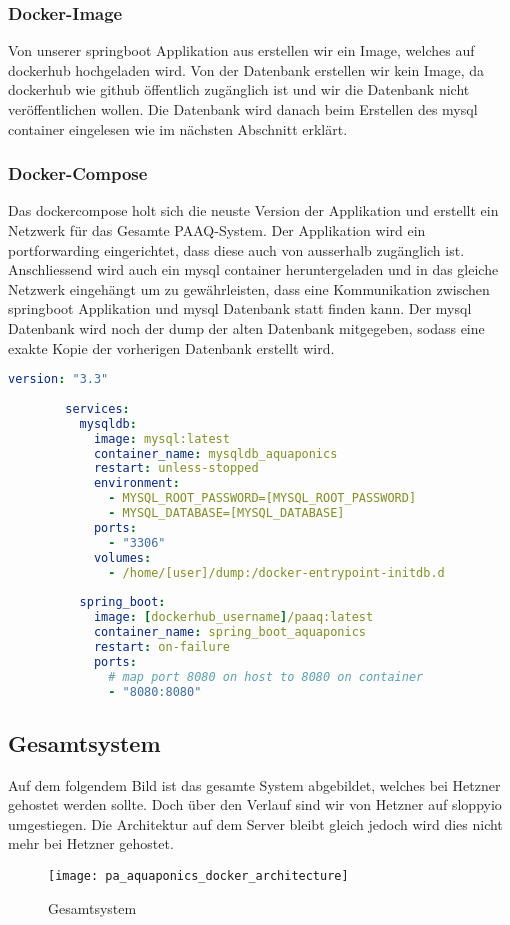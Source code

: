 \documentclass[../main.tex]{subfiles}
\begin{document}
	\subsubsection{Docker-Image}
	Von unserer \gls{springboot} Applikation aus erstellen wir ein Image, welches auf \gls{dockerhub} hochgeladen wird. Von der Datenbank erstellen wir kein Image, da \gls{dockerhub} wie \gls{github} öffentlich zugänglich ist und wir die Datenbank nicht veröffentlichen wollen. Die Datenbank wird danach beim Erstellen des \gls{mysql} \gls{container} eingelesen wie im nächsten Abschnitt erklärt.
	
	\subsubsection{Docker-Compose}
	Das \gls{dockercompose} holt sich die neuste Version der Applikation und erstellt ein Netzwerk für das Gesamte PAAQ-System. Der Applikation wird ein \gls{portforwarding} eingerichtet, dass diese auch von ausserhalb zugänglich ist. Anschliessend wird auch ein \gls{mysql} \gls{container} heruntergeladen und in das gleiche Netzwerk eingehängt um zu gewährleisten, dass eine Kommunikation zwischen \gls{springboot} Applikation und \gls{mysql} Datenbank statt finden kann. Der \gls{mysql} Datenbank wird noch der \gls{dump} der alten Datenbank mitgegeben, sodass eine exakte Kopie der vorherigen Datenbank erstellt wird.
	\begin{lstlisting}[language=yaml]
		version: "3.3"
		
		services:
		  mysqldb:
		    image: mysql:latest
		    container_name: mysqldb_aquaponics
		    restart: unless-stopped
		    environment:
		      - MYSQL_ROOT_PASSWORD=[MYSQL_ROOT_PASSWORD]
		      - MYSQL_DATABASE=[MYSQL_DATABASE]
		    ports:
		      - "3306"
		    volumes:
		      - /home/[user]/dump:/docker-entrypoint-initdb.d
		      
		  spring_boot:
		    image: [dockerhub_username]/paaq:latest
		    container_name: spring_boot_aquaponics
		    restart: on-failure
		    ports:
		      # map port 8080 on host to 8080 on container
		      - "8080:8080"
	\end{lstlisting}

	\subsection{Gesamtsystem}
	Auf dem folgendem Bild ist das gesamte System abgebildet, welches bei Hetzner gehostet werden sollte. Doch über den Verlauf sind wir von Hetzner auf \gls{sloppyio} umgestiegen. Die Architektur auf dem Server bleibt gleich jedoch wird dies nicht mehr bei Hetzner gehostet.
	\begin{figure}[H]
		\centering
		\texttt{[image: pa\_aquaponics\_docker\_architecture]}
		\caption{Gesamtsystem}
		\label{fig:Gesamtsystem}
	\end{figure}
	
\end{document}
